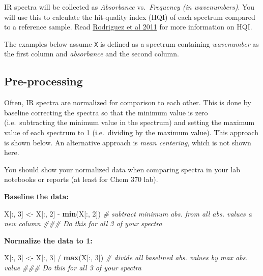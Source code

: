 \documentclass[]{tufte-book}
\newenvironment{Shaded}{}{}
\newcommand{\CommentTok}[1]{\textcolor[rgb]{0.38,0.63,0.69}{\textit{#1}}}
\newcommand{\DecValTok}[1]{\textcolor[rgb]{0.25,0.63,0.44}{#1}}
\newcommand{\KeywordTok}[1]{\textcolor[rgb]{0.00,0.44,0.13}{\textbf{#1}}}
\newcommand{\NormalTok}[1]{#1}
\newcommand{\OperatorTok}[1]{\textcolor[rgb]{0.40,0.40,0.40}{#1}}
\newcommand{\StringTok}[1]{\textcolor[rgb]{0.25,0.44,0.63}{#1}}
\begin{document}
IR spectra will be collected as \emph{Absorbance} vs.~\emph{Frequency (in wavenumbers)}. You will use this to calculate the hit-quality index (HQI) of each spectrum compared to a reference sample. Read \href{https://www.researchgate.net/publication/51602215_Standardization_of_Raman_spectra_for_transfer_of_spectral_libraries_across_different_instruments}{Rodriguez et al 2011} for more information on HQI.

The examples below assume \texttt{X} is defined as a spectrum containing \emph{wavenumber} as the first column and \emph{absorbance} and the second column.

\hypertarget{pre-processing}{%
\subsection*{Pre-processing}\label{pre-processing}}

Often, IR spectra are normalized for comparison to each other. This is done by baseline correcting the spectra so that the minimum value is zero (i.e.~subtracting the minimum value in the spectrum) and setting the maximum value of each spectrum to 1 (i.e.~dividing by the maximum value). This approach is shown below. An alternative approach is \emph{mean centering}, which is not shown here.

You should show your normalized data when comparing spectra in your lab notebooks or reports (at least for Chem 370 lab).

\textbf{Baseline the data:}

\begin{Shaded}
\begin{Highlighting}[]
\NormalTok{X[}\OperatorTok{:}\NormalTok{, }\DecValTok{3}\NormalTok{] <-}\StringTok{ }\NormalTok{X[}\OperatorTok{:}\NormalTok{, }\DecValTok{2}\NormalTok{] }\OperatorTok{-}\StringTok{ }\KeywordTok{min}\NormalTok{(X[}\OperatorTok{:}\NormalTok{, }\DecValTok{2}\NormalTok{])  }\CommentTok{# subtract minimum abs. from all abs. values a new column}
\CommentTok{### Do this for all 3 of your spectra}
\end{Highlighting}
\end{Shaded}

\textbf{Normalize the data to 1:}

\begin{Shaded}
\begin{Highlighting}[]
\NormalTok{X[}\OperatorTok{:}\NormalTok{, }\DecValTok{3}\NormalTok{] <-}\StringTok{ }\NormalTok{X[}\OperatorTok{:}\NormalTok{, }\DecValTok{3}\NormalTok{] }\OperatorTok{/}\StringTok{ }\KeywordTok{max}\NormalTok{(X[}\OperatorTok{:}\NormalTok{, }\DecValTok{3}\NormalTok{])  }\CommentTok{# divide all baselined abs. values by max abs. value}
\CommentTok{### Do this for all 3 of your spectra}
\end{Highlighting}
\end{Shaded}
\end{document}

